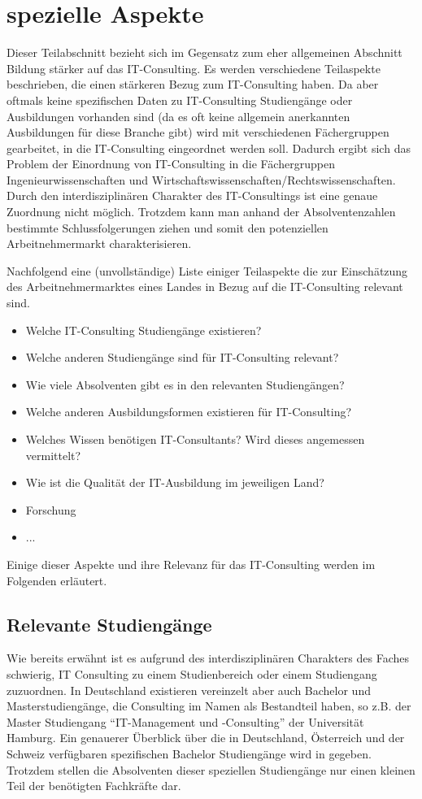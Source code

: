  \section{spezielle Aspekte}
Dieser Teilabschnitt bezieht sich im Gegensatz zum eher allgemeinen Abschnitt Bildung stärker auf das IT-Consulting. Es werden verschiedene Teilaspekte beschrieben, die einen stärkeren Bezug zum IT-Consulting haben. Da aber oftmals keine spezifischen Daten zu IT-Consulting Studiengänge oder Ausbildungen vorhanden sind (da es oft keine allgemein anerkannten Ausbildungen für diese Branche gibt) wird mit verschiedenen Fächergruppen gearbeitet, in die IT-Consulting eingeordnet werden soll. 
Dadurch ergibt sich das Problem der Einordnung von IT-Consulting in die Fächergruppen Ingenieurwissenschaften und Wirtschaftswissenschaften/Rechtswissenschaften. Durch den interdisziplinären Charakter des IT-Consultings ist eine genaue Zuordnung nicht möglich. Trotzdem kann man anhand der Absolventenzahlen bestimmte Schlussfolgerungen ziehen und somit den potenziellen Arbeitnehmermarkt charakterisieren.

Nachfolgend eine (unvollständige) Liste einiger Teilaspekte die zur Einschätzung des Arbeitnehmermarktes eines Landes in Bezug auf die IT-Consulting relevant sind. 
\begin{itemize} 
\item Welche IT-Consulting Studiengänge existieren?
\item Welche anderen Studiengänge sind für IT-Consulting relevant?
\item Wie viele Absolventen gibt es in den relevanten Studiengängen?
\item Welche anderen Ausbildungsformen existieren für IT-Consulting?
\item Welches Wissen benötigen IT-Consultants? Wird dieses angemessen vermittelt?
\item Wie ist die Qualität der IT-Ausbildung im jeweiligen Land?
\item Forschung
\item ...
\end{itemize}

Einige dieser Aspekte und ihre Relevanz für das IT-Consulting werden im Folgenden erläutert.

\subsection*{Relevante Studiengänge}
Wie bereits erwähnt ist es aufgrund des interdisziplinären Charakters des Faches schwierig, IT Consulting zu einem Studienbereich oder einem Studiengang zuzuordnen. 
In Deutschland existieren vereinzelt aber auch Bachelor und Masterstudiengänge, die Consulting im Namen als Bestandteil haben, so z.B. der Master Studiengang ``IT-Management und -Consulting'' der Universität Hamburg. Ein genauerer Überblick über die in Deutschland, Österreich und der Schweiz verfügbaren spezifischen Bachelor Studiengänge wird in \cite{NissenKlaukDeelmannMohe201209} gegeben. Trotzdem stellen die Absolventen dieser speziellen Studiengänge nur einen kleinen Teil der benötigten Fachkräfte dar.

